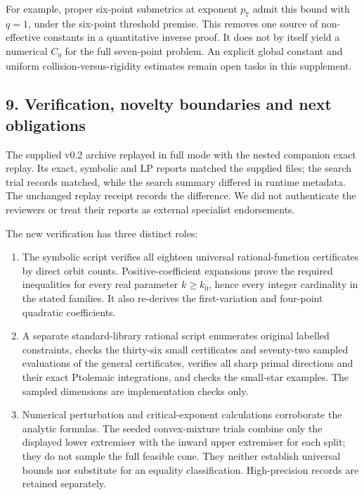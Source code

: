 \documentclass[11pt,a4paper]{article}
\newcommand{\tightlist}{\setlength{\itemsep}{0pt}\setlength{\parskip}{0pt}}
\begin{document}
For example, proper six-point submetrics at exponent \(p_7\) admit this
bound with \(q=1\), under the six-point threshold premise. This removes
one source of non-effective constants in a quantitative inverse proof.
It does not by itself yield a numerical \(C_\eta\) for the full
seven-point problem. An explicit global constant and uniform
collision-versus-rigidity estimates remain open tasks in this
supplement.

\subsection{9. Verification, novelty boundaries and next
obligations}\label{verification-novelty-boundaries-and-next-obligations}

The supplied v0.2 archive replayed in full mode with the nested
companion exact replay. Its exact, symbolic and LP reports matched the
supplied files; the search trial records matched, while the search
summary differed in runtime metadata. The unchanged replay receipt
records the difference. We did not authenticate the reviewers or treat
their reports as external specialist endorsements.

The new verification has three distinct roles:

\begin{enumerate}
\def\labelenumi{\arabic{enumi}.}
\tightlist
\item
  The symbolic script verifies all eighteen universal rational-function
  certificates by direct orbit counts. Positive-coefficient expansions
  prove the required inequalities for every real parameter \(k\ge k_0\),
  hence every integer cardinality in the stated families. It also
  re-derives the first-variation and four-point quadratic coefficients.
\item
  A separate standard-library rational script enumerates original
  labelled constraints, checks the thirty-six small certificates and
  seventy-two sampled evaluations of the general certificates, verifies
  all sharp primal directions and their exact Ptolemaic integrations,
  and checks the small-star examples. The sampled dimensions are
  implementation checks only.
\item
  Numerical perturbation and critical-exponent calculations corroborate
  the analytic formulas. The seeded convex-mixture trials combine only
  the displayed lower extremiser with the inward upper extremiser for
  each split; they do not sample the full feasible cone. They neither
  establish universal bounds nor substitute for an equality
  classification. High-precision records are retained separately.
\end{enumerate}
\end{document}

